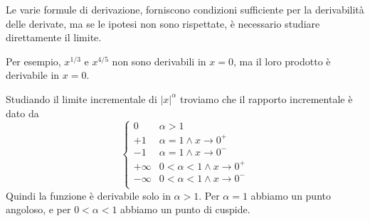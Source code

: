 \documentclass[a4paper]{article}
\begin{document}
Le varie formule di derivazione, forniscono condizioni sufficiente
per la derivabilità delle derivate, ma se le ipotesi non sono rispettate,
è necessario studiare direttamente il limite.

Per esempio, \(x^{1/3}\) e \(x^{4/5}\) non sono derivabili in \(x=0\),
ma il loro prodotto è derivabile in \(x=0\).

Studiando il limite incrementale di \({|x|}^\alpha\) troviamo che
il rapporto incrementale è dato da
\[
    \begin{cases}
        0 & \alpha > 1 \\
        +1 & \alpha = 1 \land x \to 0^+ \\
        -1 & \alpha = 1 \land x \to 0^- \\
        +\infty & 0<\alpha<1 \land x \to 0^+ \\
        -\infty & 0<\alpha<1 \land x \to 0^- \\
    \end{cases}
\]
Quindi la funzione è derivabile solo in \(\alpha > 1\).
Per \(\alpha=1\) abbiamo un punto angoloso, e per \(0<\alpha<1\)
abbiamo un punto di cuspide.

\pagebreak
\end{document}
